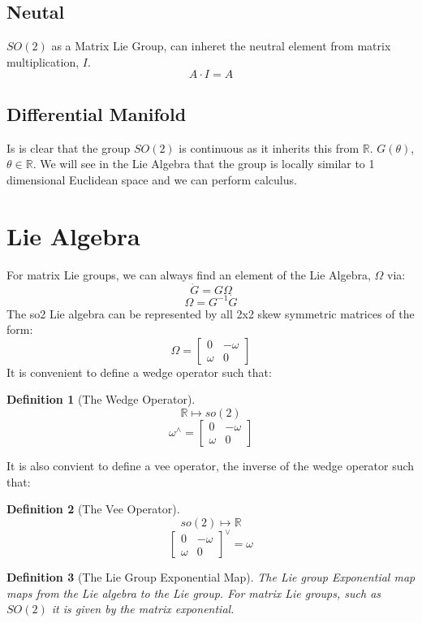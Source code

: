 \documentclass{book}
\newtheorem{definition}{Definition}
\begin{document}
\subsection*{Neutal}
%
$SO(2)$ as a Matrix Lie Group, can inheret the neutral element from matrix multiplication, $I$.
%
$$A\cdot I = A$$

\subsection*{Differential Manifold}
Is is clear that the group $SO(2)$ is continuous as it inherits this from $\mathbb{R}$.
$G(\theta)$, $\theta \in \mathbb{R}$.
We will see in the Lie Algebra that the group is locally similar to 1 dimensional Euclidean space
and we can perform calculus.


\section{Lie Algebra}
%
For matrix Lie groups, we can always find an element of the Lie Algebra, $\Omega$ via:
%
$$\dot{G} = G\Omega$$
%
$$\Omega = G^{-1}\dot{G}$$
%
The so2 Lie algebra can be represented by all 2x2 skew symmetric matrices of the form:
%
$$\Omega = \begin{bmatrix}
0 & - \omega\\
\omega & 0
\end{bmatrix}$$
%
It is convenient to define a wedge operator such that:

\begin{definition}[The Wedge Operator]
$$\mathbb{R} \mapsto so(2)$$
$$\omega^{\wedge} = \begin{bmatrix}
    0 & - \omega\\
    \omega & 0
    \end{bmatrix}$$
\end{definition}
%
It is also convient to define a vee operator, the inverse of the wedge operator such that:
%
\begin{definition}[The Vee Operator]
$$so(2) \mapsto \mathbb{R}$$
$$\begin{bmatrix}
0 & - \omega\\
\omega & 0
\end{bmatrix}^{\vee} = \omega$$
\end{definition}


\begin{definition}[The Lie Group Exponential Map]
The Lie group Exponential map maps from the Lie algebra to the Lie group.
For matrix Lie groups, such as $SO(2)$ it is given by the matrix
exponential.
\end{definition}
\end{document}
